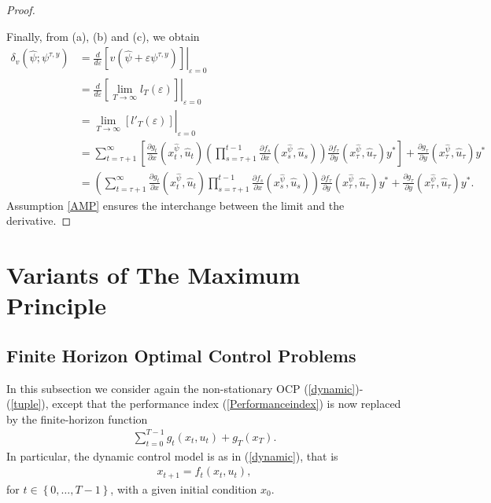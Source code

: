\documentclass[3p]{elsarticle}
\begin{document}
\begin{proof}
\begin{enumerate}
		\end{enumerate}
		Finally, from (a), (b) and (c), we obtain
		\begin{align*}
		\delta_v(\hat{\psi};\psi^{\tau,y})&=\left.\frac{d}{d\varepsilon}\left[ v(\hat\psi+\varepsilon\psi^{\tau,y})\right]\right|_{\varepsilon=0}\\
		&=\frac{d}{d\varepsilon}\left.\left[ \lim_{T\to\infty}l_T(\varepsilon)\right]\right|_{\varepsilon=0}\\
		&=\left.\lim_{T\to\infty}\left[ l'_T(\varepsilon)\right]\right|_{\varepsilon=0}\\
		&= \sum_{t=\tau+1}^\infty\left[\frac{\partial g_t}{\partial x}(x_t^{\hat{\psi}},\hat u_t)\displaystyle\left( \prod_{s=\tau+1}^{t-1}\frac{\partial f_s}{\partial x}(x_s^{\hat{\psi}},\hat u_s)\right) \frac{\partial f_\tau}{\partial y}(x_\tau^{\hat{\psi}},\hat u_\tau)y^*\right]+ \frac{\partial g_\tau}{\partial y}(x_\tau^{\hat{\psi}},\hat u_\tau)y^*\\
		&= \left( \sum_{t=\tau+1}^\infty\frac{\partial g_t}{\partial x}(x_t^{\hat{\psi}},\hat u_t)\prod_{s=\tau+1}^{t-1}\frac{\partial f_s}{\partial x}(x_s^{\hat{\psi}},\hat u_s)\right)\frac{\partial f_\tau}{\partial y}(x_\tau^{\hat{\psi}},\hat u_\tau)y^*+\frac{\partial g_\tau}{\partial y}(x_\tau^{\hat{\psi}},\hat u_\tau)y^* .
		\end{align*}
		Assumption \ref{AMP}  ensures the interchange between the limit and the derivative.
	\end{proof}
	
	
	
	
	\section{Variants of The Maximum Principle}
	 
	
	
	
	
	\subsection{Finite Horizon Optimal Control Problems}
	
	
	
	In this subsection we consider again the non-stationary OCP (\ref{dynamic})-(\ref{tuple}), except that the performance index (\ref{Performanceindex}) is now replaced by the finite-horizon function
	\begin{align}\label{Performanceindexfh}
	\sum_{t=0}^{T-1}g_t(x_t,u_t)+g_T(x_T).
	\end{align}
	In particular, the dynamic control model is as in (\ref{dynamic}), that is
	\begin{align}\label{dynamicfh}
	x_{t+1}=f_t(x_t,u_t),
	\end{align}
	for $t\in\left\lbrace 0,\dots, T-1\right\rbrace$, with a given initial condition $x_0$.
	
\end{document}
